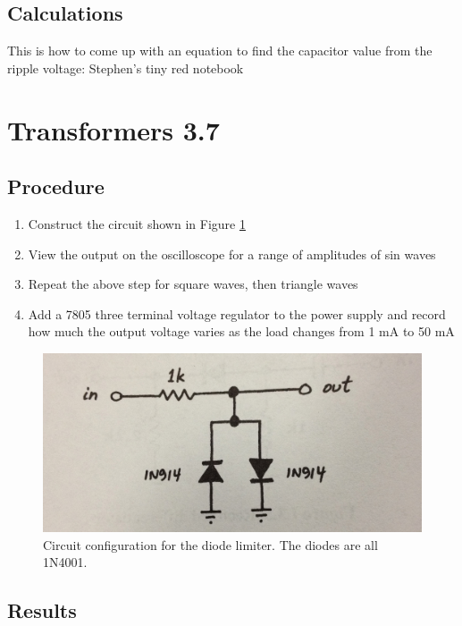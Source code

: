 \documentclass[12pt,letterpaper]{report}
\newlength \figwidth
\begin{document}
\subsection*{Calculations}
This is how to come up with an equation to find the capacitor value from the ripple voltage: Stephen's tiny red notebook

\section*{Transformers 3.7}
\subsection*{Procedure}

\begin{enumerate}
\item Construct the circuit shown in Figure \ref{fig:circuit_3}
\item View the output on the oscilloscope for a range of amplitudes of sin waves
\item Repeat the above step for square waves, then triangle waves
\item Add a 7805 three terminal voltage regulator to the power supply and record how much the  output voltage varies as the load changes from 1 mA to 50 mA
\end{enumerate}

\begin{figure}[H]
\centering
\includegraphics[width=\figwidth, keepaspectratio=true]{lab4/circuit_3.jpg}
\caption{Circuit configuration for the diode limiter. The diodes are all 1N4001.}
\label{fig:circuit_3}
\end{figure}

\subsection*{Results}
\end{document}
